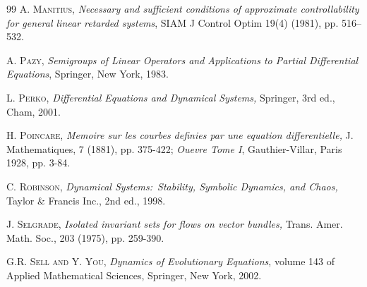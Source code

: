 \documentclass{siamltex}%
\begin{document}
\begin{thebibliography}{99}
\textsc{A. Manitius,} \emph{Necessary and sufficient
conditions of approximate controllability for general linear retarded
systems}, SIAM J Control Optim 19(4) (1981), pp. 516--532.

\textsc{A. Pazy,} \emph{Semigroups of Linear Operators and
Applications to Partial Differential Equations}, Springer, New York, 1983.

\textsc{L. Perko,} \emph{Differential Equations and Dynamical
Systems,} Springer, 3rd ed., Cham, 2001.

\textsc{H. Poincare,} \emph{Memoire sur les courbes definies
par une equation differentielle, }J. Mathematiques, 7 (1881), pp. 375-422;
\emph{Ouevre Tome I}, Gauthier-Villar, Paris 1928, pp. 3-84.

\textsc{C. Robinson,} \emph{Dynamical Systems:\ Stability,
Symbolic Dynamics, and Chaos,} Taylor \& Francis Inc., 2nd ed., 1998.

\textsc{J. Selgrade,} \emph{Isolated invariant sets for flows
on vector bundles, }Trans. Amer. Math. Soc., 203 (1975), pp. 259-390.

\textsc{G.R. Sell and Y. You,} \emph{Dynamics of
Evolutionary Equations}, volume 143 of Applied Mathematical Sciences,
Springer, New York, 2002.
\end{thebibliography}
\end{document}
